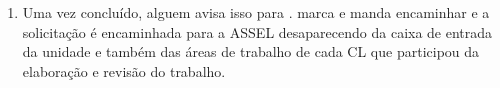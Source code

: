 \begin{landscape}
\begin{enumerate}
	{}{\ET, \EQ, \EC}{\RT, \RQ}{\EC}
	
	{}{\ET, \EQ, \EC}{\RT, \RQ}{\RT}
	
	{}{\ET, \EQ, \EC}{\RT, \RQ}{\RQ}		
	
	\item Uma vez concluído, alguem avisa isso para \ST. \ST marca e manda encaminhar e a solicitação é encaminhada para a ASSEL desaparecendo da caixa de entrada da unidade e também das áreas de trabalho de cada CL que participou da elaboração e revisão do trabalho.
	
	
\end{enumerate}

\end{landscape}

\pagebreak
